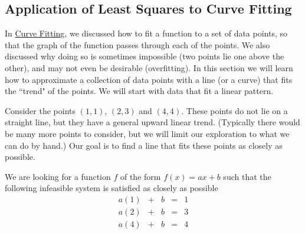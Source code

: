 \documentclass{ximera}
\begin{document}
\subsection*{Application of Least Squares to Curve Fitting}
In \href{https://ximera.osu.edu/oerlinalg/LinearAlgebra/APP-0070/main}{Curve Fitting}, we discussed how to fit a function to a set of data points, so that the graph of the function passes through each of the points.  We also discussed why doing so is sometimes impossible (two points lie one above the other), and may not even be desirable (overfitting).  In this section we will learn how to approximate a collection of data points with a line (or a curve) that fits the ``trend" of the points.  We will start with data that fit a linear pattern.  

\begin{exploration}\label{exp:leastSq2}
    Consider the points $(1,1)$, $(2, 3)$ and $(4,4)$.  These points do not lie on a straight line, but they have a general upward linear trend.  (Typically there would be many more points to consider, but we will limit our exploration to what we can do by hand.)  Our goal is to find a line that fits these points as closely as possible.  

    We are looking for a function $f$ of the form $f(x)=ax+b$ such that the following infeasible system is satisfied as closely as possible
    $$\begin{matrix}a(1)&+&b&=&1\\a(2)&+&b&=&3\\a(4)&+&b&=&4\end{matrix}$$


\end{exploration}
\end{document}
